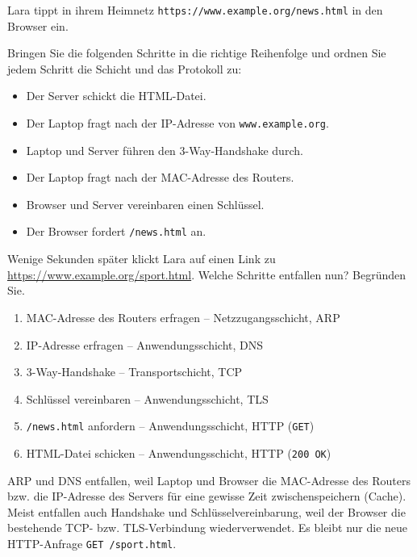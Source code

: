 \begin{myexercise}
    Lara tippt in ihrem Heimnetz \texttt{https://www.example.org/news.html} in den Browser ein.
    \begin{aenum}
        \item Bringen Sie die folgenden Schritte in die richtige Reihenfolge und ordnen Sie jedem Schritt die Schicht und das Protokoll zu:
              \begin{itemize}
                  \item Der Server schickt die \gls{HTML}-Datei.
                  \item Der Laptop fragt nach der \gls{IP}-Adresse von \texttt{www.example.org}.
                  \item Laptop und Server führen den 3-Way-Handshake durch.
                  \item Der Laptop fragt nach der \gls{MAC}-Adresse des Routers.
                  \item Browser und Server vereinbaren einen Schlüssel.
                  \item Der Browser fordert \texttt{/news.html} an.
              \end{itemize}
        \item Wenige Sekunden später klickt Lara auf einen Link zu \url{https://www.example.org/sport.html}. Welche Schritte entfallen nun? Begründen Sie.
    \end{aenum}

    \begin{myanswer}
        \begin{aenum}
            \item
                  \begin{enumerate}
                      \item \gls{MAC}-Adresse des Routers erfragen -- Netzzugangsschicht, \gls{ARP}
                      \item \gls{IP}-Adresse erfragen -- Anwendungsschicht, \gls{DNS}
                      \item 3-Way-Handshake -- Transportschicht, \gls{TCP}
                      \item Schlüssel vereinbaren -- Anwendungsschicht, \gls{TLS}
                      \item \texttt{/news.html} anfordern -- Anwendungsschicht, \gls{HTTP} (\texttt{GET})
                      \item \gls{HTML}-Datei schicken -- Anwendungsschicht, \gls{HTTP} (\texttt{200 OK})
                  \end{enumerate}
            \item \gls{ARP} und \gls{DNS} entfallen, weil Laptop und Browser die \gls{MAC}-Adresse des Routers bzw. die \gls{IP}-Adresse des Servers für eine gewisse Zeit zwischenspeichern (Cache). Meist entfallen auch Handshake und Schlüsselvereinbarung, weil der Browser die bestehende \gls{TCP}- bzw. \gls{TLS}-Verbindung wiederverwendet. Es bleibt nur die neue \gls{HTTP}-Anfrage \texttt{GET /sport.html}.
        \end{aenum}
    \end{myanswer}
\end{myexercise}

